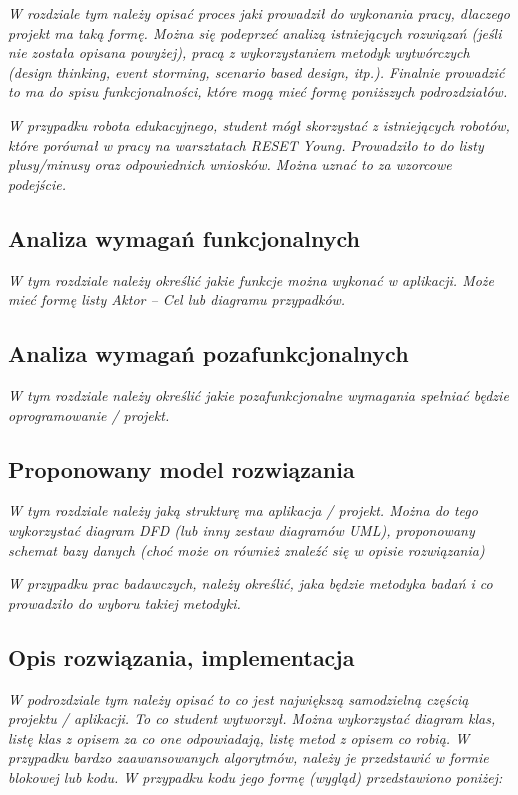 \textit{W rozdziale tym należy opisać proces jaki prowadził do wykonania pracy, dlaczego projekt ma taką formę. Można się podeprzeć analizą istniejących rozwiązań (jeśli nie została opisana powyżej), pracą z wykorzystaniem metodyk wytwórczych (design thinking, event storming, scenario based design, itp.). Finalnie prowadzić to ma do spisu funkcjonalności, które mogą mieć formę poniższych podrozdziałów.\cite{test}}

\textit{W przypadku robota edukacyjnego, student mógł skorzystać z istniejących robotów, które \cite{texbook} porównał w pracy na warsztatach RESET Young. Prowadziło to do listy plusy/minusy oraz odpowiednich wniosków. Można uznać to za wzorcowe podejście.}

\subsection{Analiza wymagań funkcjonalnych}
\textit{W tym rozdziale należy określić jakie funkcje można wykonać w aplikacji. Może mieć formę listy Aktor – Cel lub diagramu przypadków.}

\subsection{Analiza wymagań pozafunkcjonalnych}
\textit{W tym rozdziale należy określić jakie pozafunkcjonalne wymagania spełniać będzie oprogramowanie / projekt.}

\subsection{Proponowany model rozwiązania}
\textit{W tym rozdziale należy jaką strukturę ma aplikacja / projekt. Można do tego wykorzystać diagram DFD (lub inny zestaw diagramów UML), proponowany schemat bazy danych (choć może on również znaleźć się w opisie rozwiązania)}

\textit{W przypadku prac badawczych, należy określić, jaka będzie metodyka badań i co prowadziło do wyboru takiej metodyki.}

\subsection{Opis rozwiązania, implementacja}
\textit{W podrozdziale tym należy opisać to co jest największą samodzielną częścią projektu / aplikacji. To co student wytworzył. Można wykorzystać diagram klas, listę klas z opisem za co one odpowiadają, listę metod z opisem co robią. W przypadku bardzo zaawansowanych algorytmów, należy je przedstawić w formie blokowej lub kodu. W przypadku kodu jego formę (wygląd) przedstawiono poniżej:}

